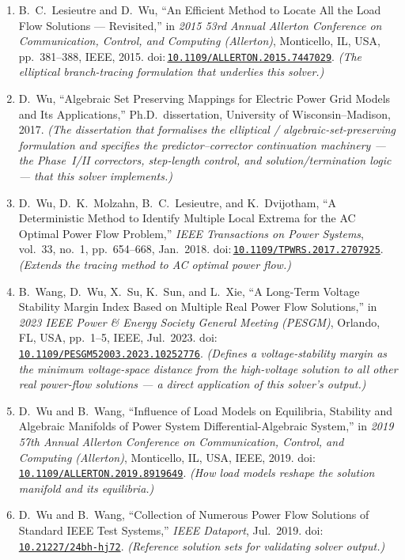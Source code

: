 \documentclass[11pt,a4paper]{article}
\newcommand{\doi}[1]{\href{https://doi.org/#1}{\nolinkurl{#1}}}
\begin{document}
\begingroup
\small
\begin{enumerate}[leftmargin=1.6em,itemsep=2pt,parsep=0pt]
\item B.\ C.\ Lesieutre and D.\ Wu, ``An Efficient Method to Locate All the Load Flow
      Solutions --- Revisited,'' in \emph{2015 53rd Annual Allerton Conference on
      Communication, Control, and Computing (Allerton)}, Monticello, IL, USA, pp.~381--388,
      IEEE, 2015. doi:\,\doi{10.1109/ALLERTON.2015.7447029}. \emph{(The elliptical
      branch-tracing formulation that underlies this solver.)}
\item D.\ Wu, ``Algebraic Set Preserving Mappings for Electric Power Grid Models and Its
      Applications,'' Ph.D.\ dissertation, University of Wisconsin--Madison, 2017.
      \emph{(The dissertation that formalises the elliptical / algebraic-set-preserving
      formulation and specifies the predictor--corrector continuation machinery --- the
      Phase~I/II correctors, step-length control, and solution/termination logic --- that
      this solver implements.)}
\item D.\ Wu, D.\ K.\ Molzahn, B.\ C.\ Lesieutre, and K.\ Dvijotham, ``A Deterministic
      Method to Identify Multiple Local Extrema for the AC Optimal Power Flow Problem,''
      \emph{IEEE Transactions on Power Systems}, vol.~33, no.~1, pp.~654--668, Jan.\ 2018.
      doi:\,\doi{10.1109/TPWRS.2017.2707925}.
      \emph{(Extends the tracing method to AC optimal power flow.)}
\item B.\ Wang, D.\ Wu, X.\ Su, K.\ Sun, and L.\ Xie, ``A Long-Term Voltage Stability
      Margin Index Based on Multiple Real Power Flow Solutions,'' in \emph{2023 IEEE Power
      \& Energy Society General Meeting (PESGM)}, Orlando, FL, USA, pp.~1--5, IEEE,
      Jul.\ 2023. doi:\,\doi{10.1109/PESGM52003.2023.10252776}.
      \emph{(Defines a voltage-stability margin as the
      minimum voltage-space distance from the high-voltage solution to all other real
      power-flow solutions --- a direct application of this solver's output.)}
\item D.\ Wu and B.\ Wang, ``Influence of Load Models on Equilibria, Stability and
      Algebraic Manifolds of Power System Differential-Algebraic System,'' in \emph{2019
      57th Annual Allerton Conference on Communication, Control, and Computing
      (Allerton)}, Monticello, IL, USA, IEEE, 2019.
      doi:\,\doi{10.1109/ALLERTON.2019.8919649}. \emph{(How load models reshape the
      solution manifold and its equilibria.)}
\item D.\ Wu and B.\ Wang, ``Collection of Numerous Power Flow Solutions of Standard IEEE
      Test Systems,'' \emph{IEEE Dataport}, Jul.\ 2019.
      doi:\,\doi{10.21227/24bh-hj72}. \emph{(Reference solution sets for validating
      solver output.)}
\end{enumerate}
\endgroup
\end{document}
